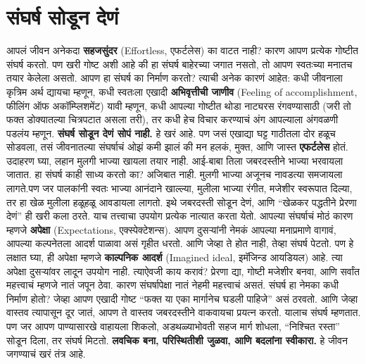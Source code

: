  \chapter{संघर्ष सोडून देणं}
आपलं जीवन अनेकदा \textbf{सहजसुंदर} (Effortless,  एफर्टलेस) का वाटत नाही? कारण आपण प्रत्येक गोष्टीत संघर्ष करतो. पण खरी गोष्ट अशी आहे की हा संघर्ष बाहेरच्या जगात नसतो, तो आपण स्वतःच्या मनातच तयार केलेला असतो.
आपण हा संघर्ष का निर्माण करतो? त्याची अनेक कारणं आहेत: कधी जीवनाला कृत्रिम अर्थ द्यायचा म्हणून, कधी स्वतःला एखादी \textbf{अभिवृत्तीची जाणीव} (Feeling of accomplishment,  फीलिंग ऑफ अकॉम्प्लिशमेंट) यावी म्हणून, कधी आपल्या गोष्टीत थोडा नाट्यरस रंगवण्यासाठी (जरी तो फक्त डोक्यातल्या चित्रपटात असला तरी), तर कधी हेच विचार करण्याचं अंग आपल्याला अंगवळणी पडलंय म्हणून.
\textbf{संघर्ष सोडून देणं सोपं नाही.} हे खरं आहे. पण जसं एखाद्या घट्ट गाठीतला दोर हळूच सोडवला, तसं जीवनातल्या संघर्षाचं ओझं कमी झालं की मन हलकं, मुक्त, आणि जास्त \textbf{एफर्टलेस} होतं.
उदाहरण घ्या,  लहान मुलगी भाज्या खायला तयार नाही. आई-बाबा तिला जबरदस्तीने भाज्या भरवायला जातात.
 हा संघर्ष काही साध्य करतो का? अजिबात नाही. मुलगी भाज्या अजूनच नावडत्या समजायला लागते.पण जर पालकांनी स्वतः भाज्या आनंदाने खाल्ल्या, मुलीला भाज्या रंगीत, मजेशीर स्वरूपात दिल्या, तर हा खेळ मुलीला हळूहळू आवडायला लागतो. इथे जबरदस्ती सोडून देणं, आणि ``खेळकर पद्धतीने प्रेरणा देणं''  ही खरी कला ठरते.
याच तत्त्वाचा उपयोग प्रत्येक नात्यात करता येतो. आपल्या संघर्षाचं मोठं कारण म्हणजे \textbf{अपेक्षा} (Expectations,  एक्स्पेक्टेशन्स). आपण दुसऱ्यांनी नेमकं आपल्या मनाप्रमाणे वागावं, आपल्या कल्पनेतला आदर्श पाळावा असं गृहीत धरतो. आणि जेव्हा ते होत नाही, तेव्हा संघर्ष पेटतो.
पण हे लक्षात घ्या,  ही अपेक्षा म्हणजे \textbf{काल्पनिक आदर्श} (Imagined ideal,  इमॅजिन्ड आयडियल) आहे.
 त्या अपेक्षा दुसऱ्यांवर लादून उपयोग नाही. त्याऐवजी काय करावं? प्रेरणा द्या, गोष्टी मजेशीर बनवा, आणि सर्वांत महत्त्वाचं म्हणजे नातं जपून ठेवा. कारण संघर्षापेक्षा नातं नेहमी महत्त्वाचं असतं.
संघर्ष हा नेमका कधी निर्माण होतो? जेव्हा आपण एखादी गोष्ट ``फक्त या एका मार्गानेच घडली पाहिजे''
 असं ठरवतो. आणि जेव्हा वास्तव त्यापासून दूर जातं, आपण ते वास्तव जबरदस्तीने वाकवायचा प्रयत्न करतो.
 यालाच संघर्ष म्हणतात.
पण जर आपण पाण्यासारखे वाहायला शिकलो, अडथळ्याभोवती सहज मार्ग शोधला, ``निश्चित रस्ता'' सोडून दिला, तर संघर्ष मिटतो. \textbf{लवचिक बना, परिस्थितीशी जुळवा, आणि बदलांना स्वीकारा.} हे जीवन जगण्याचं खरं तंत्र आहे.
